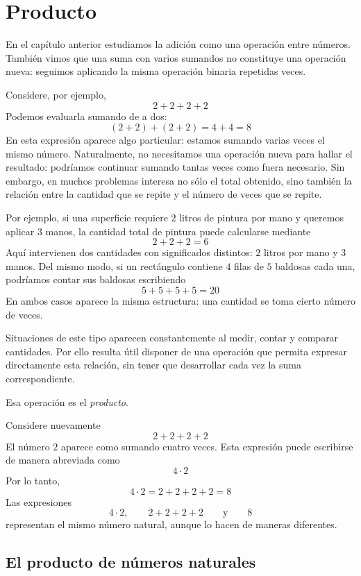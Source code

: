 \chapter{Producto}

En el capítulo anterior estudiamos la adición como una operación entre números. También vimos que una suma con varios sumandos no constituye una operación nueva: seguimos aplicando la misma operación binaria repetidas veces.

Considere, por ejemplo,
\[
2+2+2+2
\]
Podemos evaluarla sumando de a dos:
\[
(2+2)+(2+2)=4+4=8
\]
En esta expresión aparece algo particular: estamos sumando varias veces el mismo número. Naturalmente, no necesitamos una operación nueva para hallar el resultado: podríamos continuar sumando tantas veces como fuera necesario. Sin embargo, en muchos problemas interesa no sólo el total obtenido, sino también la relación entre la cantidad que se repite y el número de veces que se repite.

Por ejemplo, si una superficie requiere \(2\) litros de pintura por mano y queremos aplicar \(3\) manos, la cantidad total de pintura puede calcularse mediante
\[
2+2+2=6
\]
Aquí intervienen dos cantidades con significados distintos: \(2\) litros por mano y \(3\) manos. Del mismo modo, si un rectángulo contiene \(4\) filas de \(5\) baldosas cada una, podríamos contar sus baldosas escribiendo
\[
5+5+5+5=20
\]
En ambos casos aparece la misma estructura: una cantidad se toma cierto número de veces.

Situaciones de este tipo aparecen constantemente al medir, contar y comparar cantidades. Por ello resulta útil disponer de una operación que permita expresar directamente esta relación, sin tener que desarrollar cada vez la suma correspondiente.

Esa operación es el \emph{producto}.

\begin{example}\label{ej_intro_producto}
Considere nuevamente
\[
2+2+2+2
\]
El número \(2\) aparece como sumando cuatro veces. Esta expresión puede escribirse de manera abreviada como
\[
4\cdot2
\]
Por lo tanto,
\[
4\cdot2
=
2+2+2+2
=
8
\]
Las expresiones
\[
4\cdot2,\qquad
2+2+2+2
\qquad\text{y}\qquad
8
\]
representan el mismo número natural, aunque lo hacen de maneras diferentes.
\end{example}

\section{El producto de números naturales}

